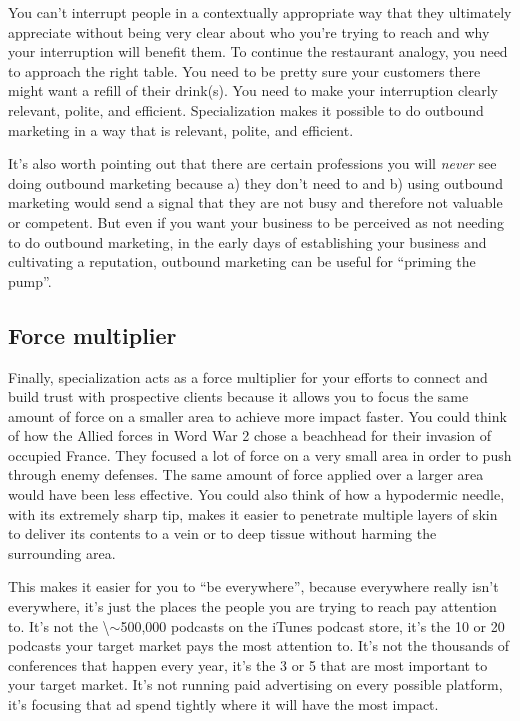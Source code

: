 You can't interrupt people in a contextually appropriate way that they ultimately appreciate without being very clear about who you're trying to reach and why your interruption will benefit them. To continue the restaurant analogy, you need to approach the right table. You need to be pretty sure your customers there might want a refill of their drink(s). You need to make your interruption clearly relevant, polite, and efficient. Specialization makes it possible to do outbound marketing in a way that is relevant, polite, and efficient.

It's also worth pointing out that there are certain professions you will \emph{never} see doing outbound marketing because a) they don't need to and b) using outbound marketing would send a signal that they are not busy and therefore not valuable or competent. But even if you want your business to be perceived as not needing to do outbound marketing, in the early days of establishing your business and cultivating a reputation, outbound marketing can be useful for ``priming the pump''.

\subsection{Force multiplier}

Finally, specialization acts as a force multiplier for your efforts to connect and build trust with prospective clients because it allows you to focus the same amount of force on a smaller area to achieve more impact faster. You could think of how the Allied forces in Word War 2 chose a beachhead for their invasion of occupied France. They focused a lot of force on a very small area in order to push through enemy defenses. The same amount of force applied over a larger area would have been less effective. You could also think of how a hypodermic needle, with its extremely sharp tip, makes it easier to penetrate multiple layers of skin to deliver its contents to a vein or to deep tissue without harming the surrounding area.

This makes it easier for you to ``be everywhere'', because everywhere really isn't everywhere, it's just the places the people you are trying to reach pay attention to. It's not the \textbackslash{}\ensuremath{\sim}500,000 podcasts on the iTunes podcast store, it's the 10 or 20 podcasts your target market pays the most attention to. It's not the thousands of conferences that happen every year, it's the 3 or 5 that are most important to your target market. It's not running paid advertising on every possible platform, it's focusing that ad spend tightly where it will have the most impact.

